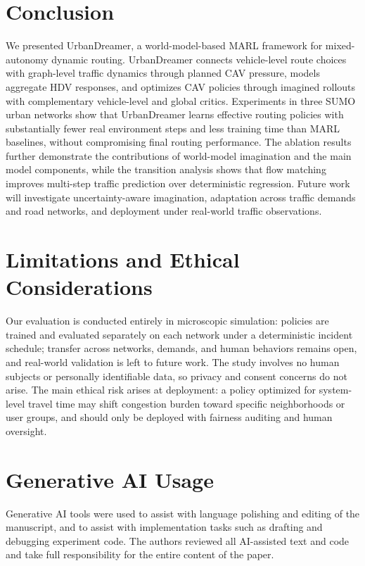 \section{Conclusion}

We presented UrbanDreamer, a world-model-based MARL framework for mixed-autonomy dynamic routing. UrbanDreamer connects vehicle-level route choices with graph-level traffic dynamics through planned CAV pressure, models aggregate HDV responses, and optimizes CAV policies through imagined rollouts with complementary vehicle-level and global critics. Experiments in three SUMO urban networks show that UrbanDreamer learns effective routing policies with substantially fewer real environment steps and less training time than MARL baselines, without compromising final routing performance. The ablation results further demonstrate the contributions of world-model imagination and the main model components, while the transition analysis shows that flow matching improves multi-step traffic prediction over deterministic regression. Future work will investigate uncertainty-aware imagination, adaptation across traffic demands and road networks, and deployment under real-world traffic observations.

\section{Limitations and Ethical Considerations}
Our evaluation is conducted entirely in microscopic simulation: policies are
trained and evaluated separately on each network under a deterministic
incident schedule; transfer across networks, demands, and human behaviors
remains open, and real-world validation is left to future work.  The study
involves no human subjects or personally identifiable data, so privacy and
consent concerns do not arise.  The main ethical risk arises at
deployment: a policy optimized for system-level travel time may shift
congestion burden toward specific neighborhoods or user groups, and should
only be deployed with fairness auditing and human oversight.

\section{Generative AI Usage}
Generative AI tools were used to assist with language polishing and editing
of the manuscript, and to assist with implementation tasks such as drafting
and debugging experiment code.  The authors reviewed all AI-assisted text
and code and take full responsibility for the entire content of the paper.